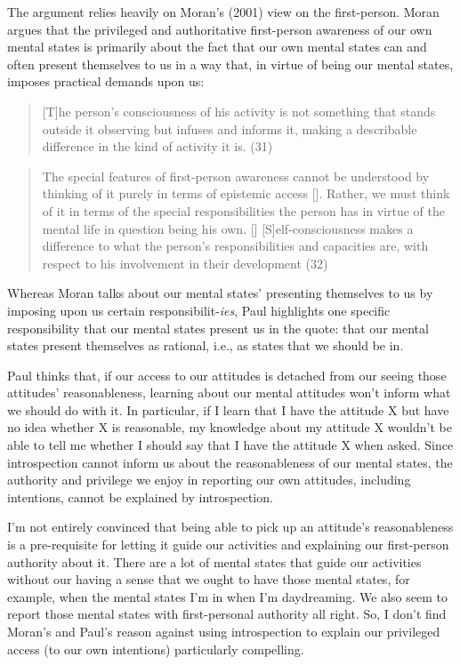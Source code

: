 \documentclass[a4paper,12pt]{article}
\begin{document}
The argument relies heavily on Moran's (2001) view on the first-person. Moran argues that the privileged and authoritative first-person awareness of our own mental states is primarily about the fact that our own mental states can and often present themselves to us in a way that, in virtue of being our mental states, imposes practical demands upon us:

\begin{quote} [T]he person's consciousness of his activity is not something that stands outside it observing but infuses and informs it, making a describable difference in the kind of activity it is. (31) \end{quote}

\begin{quote} The special features of first-person awareness cannot be understood by thinking of it purely in terms of epistemic access [\textellipsis]. Rather, we must think of it in terms of the special responsibilities the person has in virtue of the mental life in question being his own. [\textellipsis] [S]elf-consciousness makes a difference to what the person's responsibilities and capacities are, with respect to his involvement in their development (32) \end{quote}

Whereas Moran talks about our mental states' presenting themselves to us by imposing upon us certain responsibilit-\emph{ies}, Paul highlights one specific responsibility that our mental states present us in the quote: that our mental states present themselves as rational, i.e., as states that we should be in.

Paul thinks that, if our access to our attitudes is detached from our seeing those attitudes' reasonableness, learning about our mental attitudes won't inform what we should do with it. In particular, if I learn that I have the attitude X but have no idea whether X is reasonable, my knowledge about my attitude X wouldn't be able to tell me whether I should say that I have the attitude X when asked. Since introspection cannot inform us about the reasonableness of our mental states, the authority and privilege we enjoy in reporting our own attitudes, including intentions, cannot be explained by introspection.

I'm not entirely convinced that being able to pick up an attitude's reasonableness is a pre-requisite for letting it guide our activities and explaining our first-person authority about it. There are a lot of mental states that guide our activities without our having a sense that we ought to have those mental states, for example, when the mental states I'm in when I'm daydreaming. We also seem to report those mental states with first-personal authority all right. So, I don't find Moran's and Paul's reason against using introspection to explain our privileged access (to our own intentions) particularly compelling.
\end{document}
